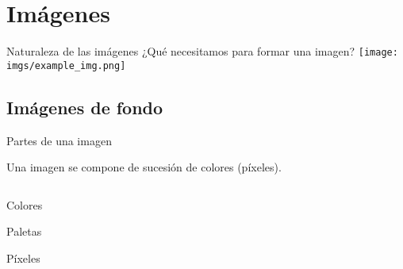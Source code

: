 \section{Imágenes}
\begin{frame}{Naturaleza de las imágenes}
    \centering\Large ¿Qué necesitamos para formar una imagen?
    \texttt{[image: imgs/example\_img.png]}
\end{frame}

\subsection{Imágenes de fondo}
\begin{frame}{Partes de una imagen}
    \begin{block}{}
        \centering{}Una imagen se compone de sucesión de colores (píxeles).
    \end{block}
    \vfill{}
    \begin{columns}
    \begin{column}{0.25\textwidth}
    \end{column}
    \begin{column}{0.05\textwidth}
    \end{column}
    \begin{column}{0.5\textwidth}
    \end{column}
    \begin{column}{0.05\textwidth}
    \end{column}
    \begin{column}{0.25\textwidth}
    \end{column}
    \end{columns}
\end{frame}

\begin{frame}{Colores}

\end{frame}

\begin{frame}{Paletas}
\end{frame}

\begin{frame}{Píxeles}
\end{frame}

